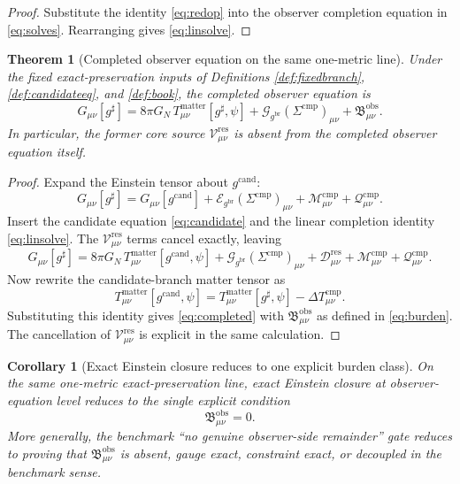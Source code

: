 \documentclass[11pt]{article}
\newcommand{\ObserverMetric}{g^{\mathrm{br}}}
\newcommand{\CandidateMetric}{g^{\mathrm{cand}}}
\newcommand{\CompletedMetric}{g^{\sharp}}
\newcommand{\CompShift}{\Sigma^{\mathrm{cmp}}}
\newcommand{\ResidualCore}{\mathcal V_{\mu\nu}^{\mathrm{res}}}
\newcommand{\ResidualDec}{\mathcal D_{\mu\nu}^{\mathrm{res}}}
\newcommand{\GaugeBook}{\mathcal G_{\ObserverMetric}}
\newcommand{\EinLin}{\mathcal E_{\ObserverMetric}}
\newcommand{\CompMix}{\mathcal M_{\mu\nu}^{\mathrm{cmp}}}
\newcommand{\CompQuad}{\mathcal Q_{\mu\nu}^{\mathrm{cmp}}}
\newcommand{\DeltaTComp}{\Delta T_{\mu\nu}^{\mathrm{cmp}}}
\newcommand{\ObsBurden}{\mathfrak B_{\mu\nu}^{\mathrm{obs}}}
\newtheorem{corollary}{Corollary}
\newtheorem{theorem}{Theorem}
\begin{document}
\begin{proof}
Substitute the identity \eqref{eq:redop} into the observer completion equation in \eqref{eq:solves}. Rearranging gives \eqref{eq:linsolve}.
\end{proof}

\begin{theorem}[Completed observer equation on the same one-metric line]
\label{thm:completed}
Under the fixed exact-preservation inputs of Definitions \ref{def:fixedbranch}, \ref{def:candidateeq}, and \ref{def:book}, the completed observer equation is
\begin{equation}
G_{\mu\nu}[\CompletedMetric]
=
8\pi G_N\,T_{\mu\nu}^{\mathrm{matter}}[\CompletedMetric,\psi]
+\GaugeBook(\CompShift)_{\mu\nu}
+\ObsBurden.
\label{eq:completed}
\end{equation}
In particular, the former core source \(\ResidualCore\) is absent from the completed observer equation itself.
\end{theorem}

\begin{proof}
Expand the Einstein tensor about \(\CandidateMetric\):
\begin{equation}
G_{\mu\nu}[\CompletedMetric]
=
G_{\mu\nu}[\CandidateMetric]
+\EinLin(\CompShift)_{\mu\nu}
+\CompMix
+\CompQuad.
\label{eq:expand}
\end{equation}
Insert the candidate equation \eqref{eq:candidate} and the linear completion identity \eqref{eq:linsolve}. The \(\ResidualCore\) terms cancel exactly, leaving
\[
G_{\mu\nu}[\CompletedMetric]
=
8\pi G_N\,T_{\mu\nu}^{\mathrm{matter}}[\CandidateMetric,\psi]
+\GaugeBook(\CompShift)_{\mu\nu}
+\ResidualDec
+\CompMix
+\CompQuad.
\]
Now rewrite the candidate-branch matter tensor as
\[
T_{\mu\nu}^{\mathrm{matter}}[\CandidateMetric,\psi]
=
T_{\mu\nu}^{\mathrm{matter}}[\CompletedMetric,\psi]
-\DeltaTComp.
\]
Substituting this identity gives \eqref{eq:completed} with \(\ObsBurden\) as defined in \eqref{eq:burden}. The cancellation of \(\ResidualCore\) is explicit in the same calculation.
\end{proof}

\begin{corollary}[Exact Einstein closure reduces to one explicit burden class]
\label{cor:collapse}
On the same one-metric exact-preservation line, exact Einstein closure at observer-equation level reduces to the single explicit condition
\begin{equation}
\ObsBurden=0.
\label{eq:exacttarget}
\end{equation}
More generally, the benchmark ``no genuine observer-side remainder'' gate reduces to proving that \(\ObsBurden\) is absent, gauge exact, constraint exact, or decoupled in the benchmark sense.
\end{corollary}
\end{document}

